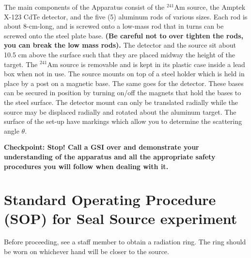 \documentclass{../lab}
\begin{document}
The main components of the Apparatus consist of the $^{241}$Am source, the Amptek X-123 CdTe detector, and the five (5) aluminum rods of various sizes. Each rod is about 8-cm-long, and is screwed onto a low-mass rod that in turns can be screwed onto the steel plate base. \textbf{(Be careful not to over tighten the rods, you can break the low mass rods).} The detector and the source sit about 10.5 cm above the surface such that they are placed midway the height of the target. The $^{241}$Am source is removable and is kept in its plastic case inside a lead box when not in use. The source mounts on top of a steel holder which is held in place by a post on a magnetic base. The same goes for the detector. These bases can be secured in position by turning on/off the magnets that hold the bases to the steel surface. The detector mount can only be translated radially while the source may be displaced radially and rotated about the aluminum target. The surface of the set-up have markings which allow you to determine the scattering angle $\theta$.

\textbf{Checkpoint: Stop! Call a GSI over and demonstrate your understanding of the apparatus and all the appropriate safety procedures you will follow when dealing with it.}

\section{Standard Operating Procedure (SOP) for Seal Source experiment}

Before proceeding, see a staff member to obtain a radiation ring. The ring should be worn on whichever hand will be closer to the source.
\end{document}
